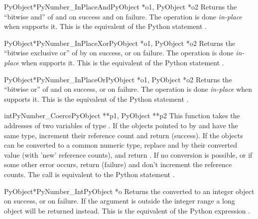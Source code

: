 \begin{cfuncdesc}{PyObject*}{PyNumber_InPlaceAnd}{PyObject *o1, PyObject *o2}
  Returns the ``bitwise and'' of  and  on success and
  \NULL{} on failure. The operation is done \emph{in-place} when
   supports it.  This is the equivalent of the Python
  statement .
\end{cfuncdesc}


\begin{cfuncdesc}{PyObject*}{PyNumber_InPlaceXor}{PyObject *o1, PyObject *o2}
  Returns the ``bitwise exclusive or'' of  by  on
  success, or \NULL{} on failure.  The operation is done
  \emph{in-place} when  supports it.  This is the equivalent
  of the Python statement .
\end{cfuncdesc}

\begin{cfuncdesc}{PyObject*}{PyNumber_InPlaceOr}{PyObject *o1, PyObject *o2}
  Returns the ``bitwise or'' of  and  on success, or
  \NULL{} on failure.  The operation is done \emph{in-place} when
   supports it.  This is the equivalent of the Python
  statement .
\end{cfuncdesc}

\begin{cfuncdesc}{int}{PyNumber_Coerce}{PyObject **p1, PyObject **p2}
  This function takes the addresses of two variables of type
  .  If the objects pointed to by 
  and  have the same type, increment their reference
  count and return  (success). If the objects can be converted
  to a common numeric type, replace  and  by their
  converted value (with 'new' reference counts), and return .
  If no conversion is possible, or if some other error occurs, return
   (failure) and don't increment the reference counts.  The
  call  is equivalent to the Python
  statement .
\end{cfuncdesc}

\begin{cfuncdesc}{PyObject*}{PyNumber_Int}{PyObject *o}
  Returns the  converted to an integer object on success, or
  \NULL{} on failure.  If the argument is outside the integer range
  a long object will be returned instead. This is the equivalent
  of the Python expression .
\end{cfuncdesc}


